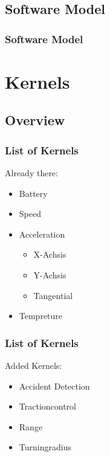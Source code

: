 \documentclass{beamer}
\begin{document}
\subsection{Software Model}
\begin{frame}
    \frametitle{Software Model}
\end{frame}

\section{Kernels}
\subsection{Overview}
\begin{frame} %
  \frametitle{List of Kernels} %
  Already there:
  \begin{itemize}
   \item Battery
   \item Speed
   \item Acceleration
   \begin{itemize}
    \item X-Achsis
    \item Y-Achsis
    \item Tangential
   \end{itemize}
   \item Tempreture
  \end{itemize}
\end{frame}
\begin{frame}
    \frametitle{List of Kernels}
    Added Kernels:
    \begin{itemize}
     \item Accident Detection
     \item Tractioncontrol
     \item Range
     \item Turningradius
    \end{itemize}
\end{frame}
\end{document}
